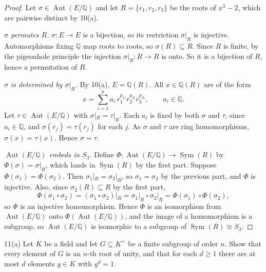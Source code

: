 \documentclass[11pt]{article}
\begin{document}
\begin{proof}
Let $\sigma \in \operatorname{Aut}(E/\mathbb{Q})$ and let
$R = \{r_1, r_2, r_3\}$ be the roots of $x^3 - 2$, which are pairwise distinct
by 10(a).

\emph{$\sigma$ permutes $R$.} $\sigma \colon E \to E$ is a bijection, so its
restriction $\sigma|_R$ is injective. Automorphisms fixing $\mathbb{Q}$ map
roots to roots, so $\sigma(R) \subseteq R$. Since $R$ is finite, by the
pigeonhole principle the injection $\sigma|_R \colon R \to R$ is onto. So it is
a bijection of $R$, hence a permutation of $R$.

\emph{$\sigma$ is determined by $\sigma|_R$.} By 10(a), $E = \mathbb{Q}(R)$.
All $x \in \mathbb{Q}(R)$ are of the form
\[
  x = \sum_{i=1}^{n} a_i \, r_1^{p_{1i}} r_2^{p_{2i}} r_3^{p_{3i}},
  \qquad a_i \in \mathbb{Q}.
\]
Let $\tau \in \operatorname{Aut}(E/\mathbb{Q})$ with $\sigma|_R = \tau|_R$.
Each $a_i$ is fixed by both $\sigma$ and $\tau$, since $a_i \in \mathbb{Q}$, and
$\sigma(r_j) = \tau(r_j)$ for each $j$. As $\sigma$ and $\tau$ are ring
homomorphisms, $\sigma(x) = \tau(x)$. Hence $\sigma = \tau$.

\emph{$\operatorname{Aut}(E/\mathbb{Q})$ embeds in $S_3$.} Define
$\Phi \colon \operatorname{Aut}(E/\mathbb{Q}) \to \operatorname{Sym}(R)$ by
$\Phi(\sigma) = \sigma|_R$, which lands in $\operatorname{Sym}(R)$ by the first
part. Suppose $\Phi(\sigma_1) = \Phi(\sigma_2)$. Then
$\sigma_1|_R = \sigma_2|_R$, so $\sigma_1 = \sigma_2$ by the previous part, and
$\Phi$ is injective. Also, since $\sigma_2(R) \subseteq R$ by the first part,
\[
  \Phi(\sigma_1 \circ \sigma_2) = (\sigma_1 \circ \sigma_2)|_R
  = \sigma_1|_R \circ \sigma_2|_R = \Phi(\sigma_1) \circ \Phi(\sigma_2),
\]
so $\Phi$ is an injective homomorphism. Hence $\Phi$ is an isomorphism from
$\operatorname{Aut}(E/\mathbb{Q})$ onto $\Phi(\operatorname{Aut}(E/\mathbb{Q}))$,
and the image of a homomorphism is a subgroup, so
$\operatorname{Aut}(E/\mathbb{Q})$ is isomorphic to a subgroup of
$\operatorname{Sym}(R) \cong S_3$.
\end{proof}

\begin{problem}{11(a)}
  Let $K$ be a field and let $G \subseteq K^\times$ be a finite subgroup of
  order $n$. Show that every element of $G$ is an $n$-th root of unity, and
  that for each $d \geq 1$ there are at most $d$ elements $g \in K$ with
  $g^d = 1$.
\end{problem}
\end{document}
